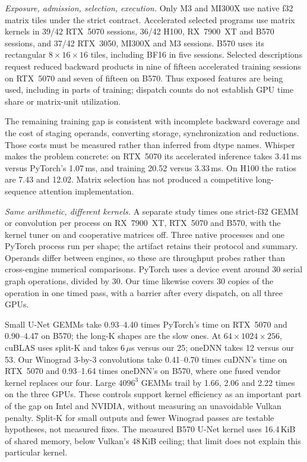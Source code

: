 \documentclass[conference]{IEEEtran}
\begin{document}
\emph{Exposure, admission, selection, execution.}
Only M3 and MI300X use native f32 matrix tiles under the strict contract.
Accelerated selected programs use matrix kernels in 39/42 RTX~5070 sessions,
36/42 H100, RX~7900~XT and B570 sessions, and 37/42 RTX~3050, MI300X and M3
sessions.
B570 uses its rectangular $8\times16\times16$ tiles, including BF16 in five
sessions. Selected descriptions request reduced backward products in nine of fifteen accelerated training sessions on RTX~5070
and seven of fifteen on B570. Thus exposed features are being
used, including in parts of training; dispatch counts do not establish GPU
time share or matrix-unit utilization.

The remaining training gap is consistent with incomplete backward coverage
and the cost of staging operands, converting storage, synchronization and
reductions. Those costs must be measured rather than inferred from dtype
names. Whisper makes the problem concrete: on RTX~5070 its accelerated
inference takes 3.41\,ms versus PyTorch's 1.07\,ms, and training 20.52 versus
3.33\,ms. On H100 the ratios are 7.43 and 12.02. Matrix selection has not
produced a competitive long-sequence attention implementation.

\emph{Same arithmetic, different kernels.}
A separate study times one strict-f32 GEMM or convolution per process on
RX~7900~XT, RTX~5070 and B570, with the kernel tuner on and cooperative
matrices off. Three native processes and one PyTorch process run per shape;
the artifact retains their protocol and summary. Operands differ between
engines, so these are throughput probes rather than cross-engine numerical
comparisons. PyTorch uses a device event around 30 serial graph operations,
divided by 30. Our time likewise covers 30 copies of the
operation in one timed pass, with a barrier after every dispatch, on all
three GPUs.

Small U-Net GEMMs take 0.93--4.40 times PyTorch's time on RTX~5070 and
0.90--4.47 on B570; the long-K shapes are the slow ones. At
$64\times1024\times256$, cuBLAS uses split-K and takes 6\,$\mu$s versus our
25; oneDNN takes 12 versus our 53. Our Winograd 3-by-3 convolutions take
0.41--0.70 times cuDNN's time on RTX~5070 and 0.93--1.64 times oneDNN's on
B570, where one fused vendor kernel replaces our four. Large $4096^3$ GEMMs
trail by 1.66, 2.06 and 2.22 times on the three GPUs. These controls support
kernel efficiency as an important part of the gap on Intel and NVIDIA,
without measuring an unavoidable Vulkan penalty. Split-K for small outputs
and fewer Winograd passes are testable hypotheses, not measured fixes. The
measured B570 U-Net kernel uses 16.4\,KiB of shared memory, below Vulkan's
48\,KiB ceiling; that limit does not explain this particular kernel.
\end{document}

